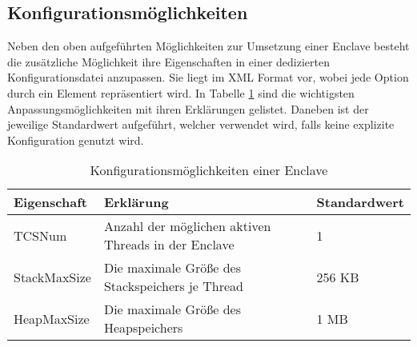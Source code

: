 %	
%	

\subsection{Konfigurationsmöglichkeiten}

Neben den oben aufgeführten Möglichkeiten zur Umsetzung einer Enclave besteht die zusätzliche Möglichkeit ihre Eigenschaften in einer dedizierten Konfigurationsdatei anzupassen. Sie liegt im \ac{XML} Format vor, wobei jede Option durch ein Element repräsentiert wird. In Tabelle \ref{tab:sgxconfig} sind die wichtigsten Anpassungsmöglichkeiten mit ihren Erklärungen gelistet. Daneben ist der jeweilige Standardwert aufgeführt, welcher verwendet wird, falls keine explizite Konfiguration genutzt wird.

\begin{table}[h]
	\centering
	\caption{Konfigurationsmöglichkeiten einer Enclave}
	\begin{tabular}{|l|l|l|}
		\hline
		\textbf{Eigenschaft} & \textbf{Erklärung} & \textbf{Standardwert} \\
		\hline
		TCSNum & Anzahl der möglichen aktiven Threads in der Enclave & 1 \\
		\hline
		StackMaxSize & Die maximale Größe des Stackspeichers je Thread & 256 KB \\
		\hline
		HeapMaxSize & Die maximale Größe des Heapspeichers & 1 MB \\
		\hline
	\end{tabular}
	\label{tab:sgxconfig}
\end{table}

